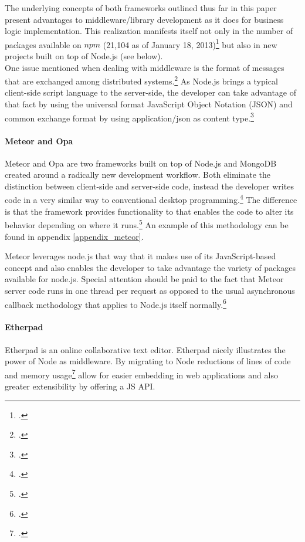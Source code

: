 The underlying concepts of both frameworks outlined thus far in this paper present advantages to middleware/library development as it does for business logic implementation. This realization manifests itself not only in the number of packages available on $npm$ (21,104 as of January 18, 2013)\footcite[Cf.][]{node_packages} but also in new projects built on top of Node.js (see below).\\

One issue mentioned when dealing with middleware is the format of messages that are exchanged among distributed systems.\footcite[149]{Tannenbaum_2007} As Node.js brings a typical client-side script language to the server-side, the developer can take advantage of that fact by using the universal format JavaScript Object Notation (JSON) and common exchange format by using application/json as content type.\footcite[Cf.][]{rfc4627}

\paragraph{Meteor and Opa}
Meteor and Opa are two frameworks built on top of Node.js and MongoDB created around a radically new development workflow. Both eliminate the distinction between client-side and server-side code, instead the developer writes code in a very similar way to conventional desktop programming.\footcite[Cf.][]{meteor_docs} The difference is that the framework provides functionality to that enables the code to alter its behavior depending on where it runs.\footcite[Cf.][]{meteor_docs} An example of this methodology can be found in appendix \ref{appendix_meteor}.

Meteor leverages node.js that way that it makes use of its JavaScript-based concept and also enables the developer to take advantage the variety of packages available for node.js. Special attention should be paid to the fact that Meteor server code runs in one thread per request as opposed to the usual asynchronous callback methodology that applies to Node.js itself normally.\footcite[Cf.][]{meteor_docs}

\paragraph{Etherpad}
Etherpad is an online collaborative text editor. Etherpad nicely illustrates the power of Node as middleware. By migrating to Node reductions of lines of code and memory usage\footcite[Cf.][]{Weissschuh_2013} allow for easier embedding in web applications and also greater extensibility by offering a JS API.


